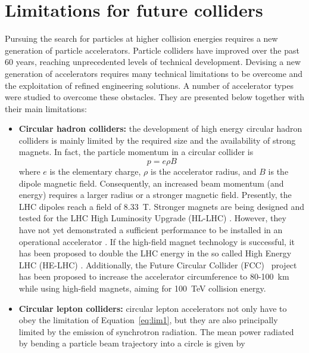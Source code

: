 \section[Limitations for future colliders]{Limitations for future colliders}
Pursuing the search for particles at higher collision energies requires a new generation of particle accelerators. Particle colliders have improved over the past 60 years, reaching unprecedented levels of technical development. Devising a new generation of accelerators requires many technical limitations \cite{CAS:Ferrario-limitiations, CAS:Assman-limitiations} to be overcome and the exploitation of refined engineering solutions. A number of accelerator types were studied to overcome these obstacles. They are presented below together with their main limitations:

\begin{itemize}
\item \textbf{Circular hadron colliders:} the development of high energy circular hadron colliders is mainly limited by the required size and the availability of strong magnets. In fact, the particle momentum in a circular collider is 
\begin{equation}
p = e\rho B \label{eq:lim1}
\end{equation}
where $e$ is the elementary charge, $\rho$ is the accelerator radius, and $B$ is the dipole magnetic field. Consequently, an increased beam momentum (and energy) requires a larger radius or a stronger magnetic field. Presently, the LHC dipoles reach a field of 8.33~T. Stronger magnets are being designed and tested for the LHC High Luminosity Upgrade (HL-LHC) \cite{HL-LHC:cdr}. However, they have not yet demonstrated a sufficient performance to be installed in an operational accelerator \cite{Rossi:IPAC19}. If the high-field magnet technology is successful, it has been proposed to double the LHC energy in the so called High Energy LHC (HE-LHC) \cite{HE-LHC:cdr}. Additionally, the Future Circular Collider (FCC)~\cite{FCC-hh:cdr} project has been proposed to increase the accelerator circumference to 80-100~km while using high-field magnets, aiming for 100~TeV collision energy.
\item \textbf{Circular lepton colliders:} circular lepton accelerators not only have to obey the limitation of Equation~\ref{eq:lim1}, but they are also principally limited by the emission of synchrotron radiation. The mean power radiated by bending a particle beam trajectory into a circle is given by
\begin{equation}

\end{equation}
\end{itemize}
